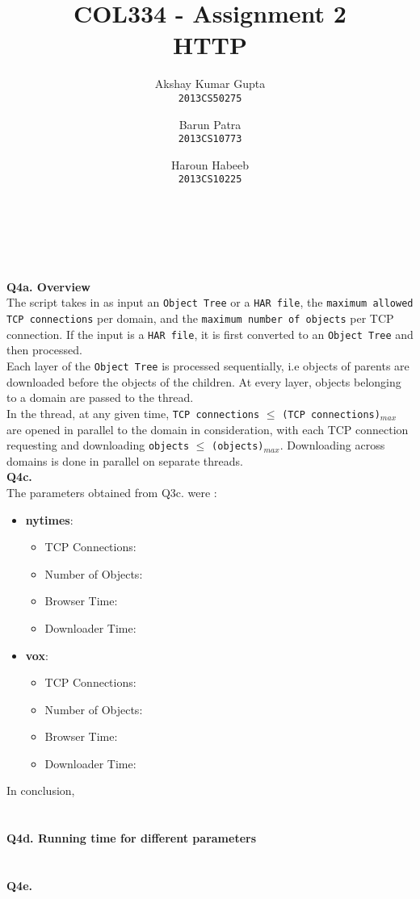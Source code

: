 \documentclass[12pt]{article}
\begin{document}
\title{COL334 - Assignment 2\\ HTTP}
\author{Akshay Kumar Gupta\\\texttt{2013CS50275} \and  Barun Patra\\\texttt{2013CS10773} \and Haroun Habeeb\\\texttt{2013CS10225}}
\date{}
\maketitle
{}
\\\\\\
{\bfseries Q4a. Overview} %
\\The script takes in as input an \texttt{Object Tree} or a \texttt{HAR file}, the \texttt{maximum allowed TCP connections} per domain, and the \texttt{maximum number of objects} per TCP connection. If the input is a \texttt{HAR file}, it is first converted to an \texttt{Object Tree} and then processed. \\
Each layer of the \texttt{Object Tree} is processed sequentially, i.e objects of parents are downloaded before the objects of the children. At every layer, objects belonging to a domain are passed to the thread.\\ 
In the thread, at any given time, \texttt{TCP connections} $\leq$ \texttt{(TCP connections)$_{max}$} are opened in parallel to the domain in consideration, with each TCP connection requesting and downloading \texttt{objects} $\leq$ \texttt{(objects)$_{max}$}. Downloading across domains is done in parallel on separate threads.
\\
{\bfseries Q4c.} %
\\The parameters obtained from Q3c. were :
\begin{itemize}
\item \textbf{nytimes}: 
\begin{itemize}
	\item TCP Connections:
	\item Number of Objects:
	\item Browser Time:
	\item Downloader Time:
\end{itemize}
\item \textbf{vox}:
\begin{itemize}
	\item TCP Connections:
	\item Number of Objects:
	\item Browser Time:
	\item Downloader Time:
\end{itemize}
\end{itemize}
In conclusion, 
\\\\\\
{\bfseries Q4d. Running time for different parameters}
\\\\\\
{\bfseries Q4e.}
\end{document}
